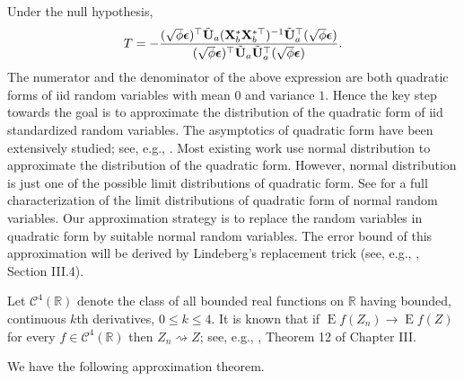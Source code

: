 \documentclass[11pt]{article}
\DeclareMathOperator{\myE}{E}
\theoremstyle{plain}
\theoremstyle{definition}
\theoremstyle{remark}
\begin{document}
Under the null hypothesis,
\begin{equation*}
    T=-\frac{ (\sqrt \phi \boldsymbol{\epsilon})^\top \tilde {\mathbf{U}}_a (\mathbf{X}_b^* \mathbf{X}_b^{*\top})^{-1} \tilde {\mathbf{U}}_a^\top (\sqrt \phi \boldsymbol{\epsilon})}{ (\sqrt \phi \boldsymbol{\epsilon})^\top \tilde {\mathbf{U}}_a  \tilde {\mathbf{U}}_a^\top (\sqrt \phi \boldsymbol{\epsilon})}.
\end{equation*}
The numerator and the denominator of the above expression are both quadratic forms of iid random variables with mean $0$ and variance $1$.
Hence the key step towards the goal is to approximate the distribution of the quadratic form of iid standardized random variables.
The asymptotics of quadratic form have been extensively studied; see, e.g., \cite{jiang1996reml,Bentkus1996Optimal,Goetze2002,Dicker2015Flexible,Bai2017}.
Most existing work use normal distribution to approximate the distribution of the quadratic form.
However, normal distribution is just one of the possible limit distributions of quadratic form.
See \cite{Sevast1961A} for a full characterization of the limit distributions of quadratic form of normal random variables.
Our approximation strategy is to replace the random variables in quadratic form by suitable normal random variables.
The error bound of this approximation will be derived by Lindeberg's replacement trick (see, e.g., \cite{pollard1984convergence}, Section III.4).

Let $\mathscr C^4(\mathbb R)$ denote the class of all bounded real functions on $\mathbb R$ having bounded, continuous $k$th derivatives, $0\leq k\leq 4$.
It is known that if $\myE f(Z_n)\to \myE f(Z)$ for every $f\in \mathscr C^4 (\mathbb R)$ then $Z_n \rightsquigarrow Z$; see, e.g., \cite{pollard1984convergence}, Theorem 12 of Chapter III.




We have the following approximation theorem.
\end{document}
